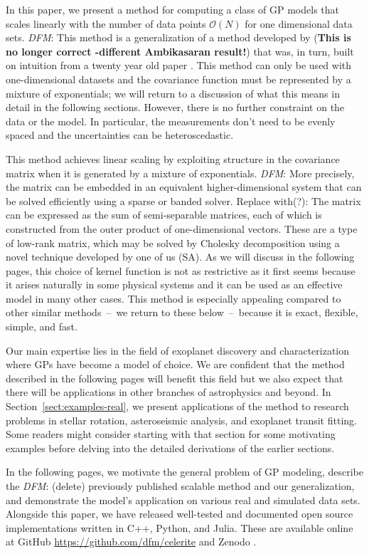 \documentclass[manuscript, letterpaper]{aastex6}
\newcommand{\project}[1]{\textsf{#1}}
\newcommand{\sectionname}{Section}
\newcommand{\sectref}[1]{\ref{sect:#1}}
\newcommand{\Sect}[1]{\sectionname~\sectref{#1}}
\newcommand{\sect}[1]{\Sect{#1}}
\newcommand{\todo}[3]{{\color{#2}\emph{#1}: #3}}
\newcommand{\dfmtodo}[1]{\todo{DFM}{red}{#1}}
\begin{document}
In this paper, we present a method for computing a class of GP models that
scales linearly with the number of data points $\mathcal{O}(N)$ for one
dimensional data sets.
\dfmtodo{This method is a generalization of a method developed by
\citet{Ambikasaran:2015}
 ({\bf This is no longer correct -different Ambikasaran result!})}
that was, in turn, built on intuition from a twenty
year old paper \citep{Rybicki:1995}.
This method can only be used with one-dimensional datasets and the covariance
function must be represented by a mixture of exponentials; we will return to a
discussion of what this means in detail in the following sections.
However, there is no further constraint on the data or the model.
In particular, the measurements don't need to be evenly spaced and the
uncertainties can be heteroscedastic.

This method achieves linear scaling by exploiting structure in the covariance
matrix when it is generated by a mixture of exponentials.
\dfmtodo{More precisely, the matrix can be embedded in an equivalent higher-dimensional
system that can be solved efficiently using a sparse or banded solver. Replace
with(?): The matrix can be expressed as the sum of semi-separable matrices, each
of which is constructed from the outer product of one-dimensional vectors.  These
are a type of low-rank matrix, which may be solved by Cholesky decomposition
using a novel technique developed by one of us (SA).}
As we will discuss in the following pages, this choice of kernel function is
not as restrictive as it first seems because it arises naturally in some
physical systems and it can be used as an effective model in many other cases.
This method is especially appealing compared to other similar methods~--~we
return to these below~--~because it is exact, flexible, simple, and fast.

Our main expertise lies in the field of exoplanet discovery and
characterization where GPs have become a model of choice.
We are confident that the method described in the following pages will benefit
this field but we also expect that there will be applications in other
branches of astrophysics and beyond.
In \sect{examples-real}, we present applications of the method to research
problems in stellar rotation, asteroseismic analysis, and exoplanet transit
fitting.
Some readers might consider starting with that section for some motivating
examples before delving into the detailed derivations of the earlier sections.

In the following pages, we motivate the general problem of GP modeling,
describe the \dfmtodo{(delete) previously published} scalable method
\citep{Rybicki:1995, Ambikasaran:2015} and our generalization, and demonstrate
the model's application on various real and simulated data sets.
Alongside this paper, we have released well-tested and documented open source
implementations written in \project{C++}, \project{Python}, and
\project{Julia}.
These are available online at \project{GitHub}
\url{https://github.com/dfm/celerite} and \project{Zenodo}
\citep{Foreman-Mackey:2017}.
\end{document}
